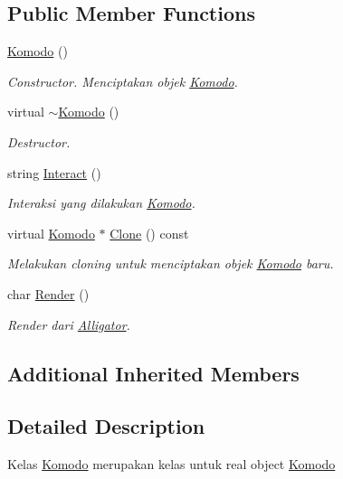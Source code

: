 \subsection*{Public Member Functions}
\begin{DoxyCompactItemize}
\item 
\hyperlink{classKomodo_a663a1a18bc7ac367f1a55a385604258d}{Komodo} ()
\begin{DoxyCompactList}\small\item\em Constructor. Menciptakan objek \hyperlink{classKomodo}{Komodo}. \end{DoxyCompactList}\item 
virtual \hyperlink{classKomodo_a16e327cbffe1088c1f04c397c1fbc6dd}{$\sim$\+Komodo} ()
\begin{DoxyCompactList}\small\item\em Destructor. \end{DoxyCompactList}\item 
string \hyperlink{classKomodo_a250e6b06c369a94faaa551751cd09196}{Interact} ()
\begin{DoxyCompactList}\small\item\em Interaksi yang dilakukan \hyperlink{classKomodo}{Komodo}. \end{DoxyCompactList}\item 
virtual \hyperlink{classKomodo}{Komodo} $\ast$ \hyperlink{classKomodo_aab3bd7ee8235c87e8bbafd8848968be8}{Clone} () const 
\begin{DoxyCompactList}\small\item\em Melakukan cloning untuk menciptakan objek \hyperlink{classKomodo}{Komodo} baru. \end{DoxyCompactList}\item 
char \hyperlink{classKomodo_a06ce8ed3d58a33968ecf4a12a3ebbd4d}{Render} ()
\begin{DoxyCompactList}\small\item\em Render dari \hyperlink{classAlligator}{Alligator}. \end{DoxyCompactList}\end{DoxyCompactItemize}
\subsection*{Additional Inherited Members}


\subsection{Detailed Description}
Kelas \hyperlink{classKomodo}{Komodo} merupakan kelas untuk real object \hyperlink{classKomodo}{Komodo} 

